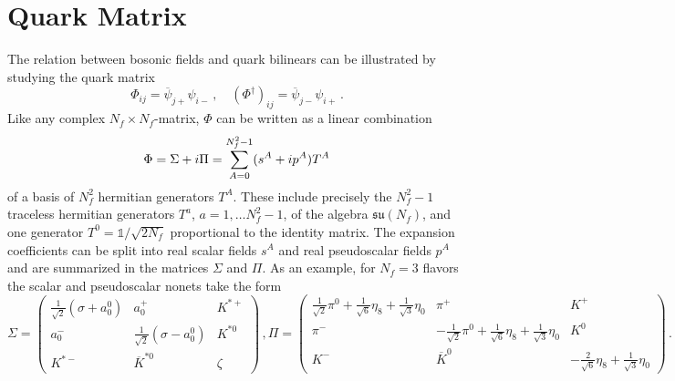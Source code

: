 \section{Quark Matrix}

The relation between bosonic fields and quark bilinears can be illustrated by studying the quark matrix
\begin{equation}
    \Phi_{ij}=\overline{\psi}_{j+}\psi_{i-}\,,\quad (\Phi^\dagger)_{ij}=\overline{\psi}_{j-}\psi_{i+}\,.
    \label{eq:QuarkMatrixDef}
\end{equation}
Like any complex $N_f\times N_f$-matrix, $\Phi$ can be written as a linear combination
\begin{equation}
    \Phi=\Sigma+{i}\Pi=\sum_{A=0}^{N_f^2-1}(s^A+{i} p^A)T^A
    \label{eq:QuarkMatrixExpansion}
\end{equation}
of a basis of $N_f^2$ hermitian generators $T^A$. These include precisely the $N_f^2-1$ traceless hermitian generators $T^a$, ${a=1,\dots N_f^2-1}$, of the algebra $\mathfrak{su}(N_f)$, and one generator $T^0=\mathbb{1}/\sqrt{2N_f}$ proportional to the identity matrix. The expansion coefficients can be split into real scalar fields $s^A$ and real pseudoscalar fields $p^A$ and are summarized in the matrices $\Sigma$ and $\Pi$. As an example, for $N_f=3$ flavors the scalar and pseudoscalar nonets take the form \cite{Schaffner-BielichRandrup_1999}
\begin{subequations}
    \begin{equation}
        \Sigma=\begin{pmatrix}
            \frac{1}{\sqrt{2}}(\sigma+a_0^0)&a_0^+&K^{*+}\\
            a_0^-&\frac{1}{\sqrt{2}}(\sigma-a_0^0)&K^{*0}\\
            K^{*-}&\overline{K}^{*0}&\zeta
        \end{pmatrix}\,,
        \label{eq:QuarkMatrixSU3_scalar}
    \end{equation}
    \begin{equation}
        \Pi=\begin{pmatrix}
            \frac{1}{\sqrt{2}}\pi^0+\frac{1}{\sqrt{6}}\eta_8+\frac{1}{\sqrt{3}}\eta_0&\pi^+&K^+\\
            \pi^-&-\frac{1}{\sqrt{2}}\pi^0+\frac{1}{\sqrt{6}}\eta_8+\frac{1}{\sqrt{3}}\eta_0&K^0\\
            K^-&\overline{K}^0&-\frac{2}{\sqrt{6}}\eta_8+\frac{1}{\sqrt{3}}\eta_0
        \end{pmatrix}\,.
        \label{eq:QuarkMatrixSU3_pseudoscalar}
    \end{equation}
    \label{eq:QuarkMatrixSU3}
\end{subequations}

